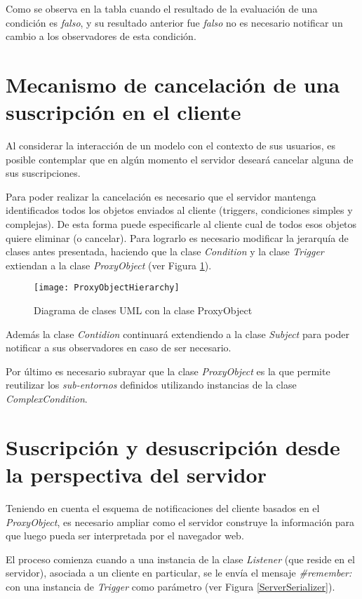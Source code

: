 Como se observa en la tabla cuando el resultado de la evaluación de una condición es \emph{falso}, y su resultado anterior fue \emph{falso} no es necesario notificar un cambio a los observadores de esta condición.


\section{Mecanismo de cancelación de una suscripción en el cliente}

Al considerar la interacción de un modelo con el contexto de sus usuarios, es posible contemplar que en algún momento el servidor deseará cancelar alguna de sus suscripciones.

Para poder realizar la cancelación es necesario que el servidor mantenga identificados todos los objetos enviados al cliente (triggers, condiciones simples y complejas). De esta forma puede especificarle al cliente cual de todos esos objetos quiere eliminar (o cancelar). Para lograrlo es necesario modificar la jerarquía de clases antes presentada, haciendo que la clase \emph{Condition} y la clase \emph{Trigger} extiendan a la clase \emph{ProxyObject} (ver Figura \ref{ProxyObjectHierarchy}).

\begin{figure}[ht!]
\centering
\texttt{[image: ProxyObjectHierarchy]}
\caption{Diagrama de clases UML con la clase ProxyObject}
\label{ProxyObjectHierarchy}
\end{figure}

Además la clase \emph{Contidion} continuará extendiendo a la clase \emph{Subject} para poder notificar a sus observadores en caso de ser necesario.

Por último es necesario subrayar que la clase \emph{ProxyObject} es la que permite reutilizar los \emph{sub-entornos} definidos utilizando instancias de la clase \emph{ComplexCondition}.


\section{Suscripción y desuscripción desde la perspectiva del servidor}

Teniendo en cuenta el esquema de notificaciones del cliente basados en el \emph{ProxyObject}, es necesario ampliar como el servidor construye la información para que luego pueda ser interpretada por el navegador web.

El proceso comienza cuando a una instancia de la clase \emph{Listener} (que reside en el servidor), asociada a un cliente en particular, se le envía el mensaje \emph{\#remember:} con una instancia de \emph{Trigger} como parámetro (ver Figura \ref{ServerSerializer}).

